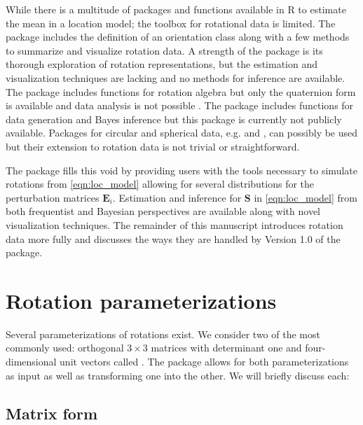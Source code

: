While there is a multitude of packages and functions available in R to estimate the mean in a location model; the toolbox for rotational data is limited.  The  \citep{murdoch2003} package includes the definition of an orientation class along with a few methods to summarize and visualize rotation data.  A strength of the  package is its thorough exploration of rotation representations, but the estimation and visualization techniques are lacking and no methods for inference are available.  The  package includes functions for rotation algebra but only the quaternion form is available and data analysis is not possible  \citep{hankin2011}.  The   \citep{qu2013} package includes functions for data generation and Bayes inference but this package is currently not publicly available.  Packages for circular and spherical data, e.g.  \citep{agostinelli2011} and  \citep{oh2013}, can possibly be used but their extension to rotation data is not trivial or straightforward.

The  package fills this void by providing users with the tools necessary to simulate rotations from \eqref{eqn:loc_model} allowing for several distributions for the perturbation matrices $\bm E_i$.  Estimation and inference for $\bm{S}$ in \eqref{eqn:loc_model} from both frequentist and Bayesian perspectives are available along with novel visualization techniques.  The remainder of this manuscript introduces rotation data more fully and discusses the ways they are handled by Version 1.0 of the  package.

\section{Rotation parameterizations}

Several parameterizations of rotations exist. We consider two of the most commonly used: orthogonal $3\times 3$ matrices with determinant one and four-dimensional unit vectors called .  The  package allows for both parameterizations as input as well as transforming one into the other. We will briefly discuss each:

\subsection{Matrix form}\label{subsec:matrix}

